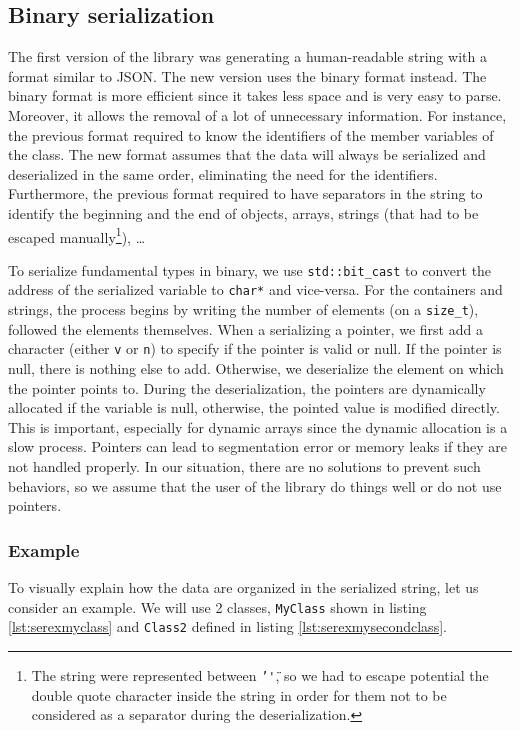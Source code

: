\subsection{Binary serialization}

The first version of the library was generating a human-readable string with a
format similar to JSON. The new version uses the binary format instead. The
binary format is more efficient since it takes less space and is very easy to
parse. Moreover, it allows the removal of a lot of unnecessary information. For
instance, the previous format required to know the identifiers of the member
variables of the class. The new format assumes that the data will always be
serialized and deserialized in the same order, eliminating the need for the
identifiers. Furthermore, the previous format required to have separators in
the string to identify the beginning and the end of objects, arrays, strings
(that had to be escaped manually\footnote{The string were represented between
\texttt{'\"'}, so we had to escape potential the double quote character inside
the string in order for them not to be considered as a separator during the
deserialization.}), \dots

To serialize fundamental types in binary, we use \texttt{std::bit\_cast} to
convert the address of the serialized variable to \texttt{char*} and vice-versa.
For the containers and strings, the process begins by writing the number of
elements (on a \texttt{size\_t}), followed the elements themselves. When a
serializing a pointer, we first add a character (either \texttt{v} or
\texttt{n}) to specify if the pointer is valid or null. If the pointer is null,
there is nothing else to add. Otherwise, we deserialize the element on which the
pointer points to. During the deserialization, the pointers are dynamically
allocated if the variable is null, otherwise, the pointed value is modified
directly. This is important, especially for dynamic arrays since the dynamic
allocation is a slow process. Pointers can lead to segmentation error or memory
leaks if they are not handled properly. In our situation, there are no solutions
to prevent such behaviors, so we assume that the user of the library do things
well or do not use pointers.

\subsubsection{Example}

To visually explain how the data are organized in the serialized string, let us
consider an example. We will use 2 classes, \texttt{MyClass} shown in listing
\ref{lst:serexmyclass} and \texttt{Class2} defined in listing
\ref{lst:serexmysecondclass}.

